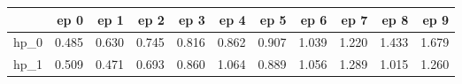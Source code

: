 \begin{tabular}{lrrrrrrrrrr}
\toprule
{} &   ep 0 &   ep 1 &   ep 2 &   ep 3 &   ep 4 &   ep 5 &   ep 6 &   ep 7 &   ep 8 &   ep 9 \\
\midrule
hp\_0 &  0.485 &  0.630 &  0.745 &  0.816 &  0.862 &  0.907 &  1.039 &  1.220 &  1.433 &  1.679 \\
hp\_1 &  0.509 &  0.471 &  0.693 &  0.860 &  1.064 &  0.889 &  1.056 &  1.289 &  1.015 &  1.260 \\
\bottomrule
\end{tabular}
